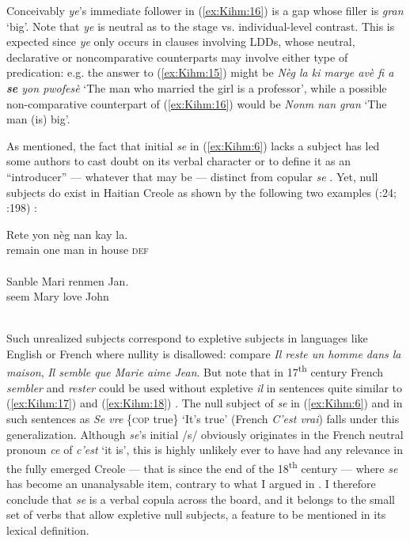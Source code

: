 \documentclass[output=paper]{langsci/langscibook}
\begin{document}
Conceivably \emph{ye}'s immediate follower in (\ref{ex:Kihm:16}) is a gap whose filler
is \emph{gran} `big'. Note that \emph{ye} is neutral as to the stage vs.
individual-level contrast. This is expected since \emph{ye} only occurs
in clauses involving LDDs, whose neutral, declarative or noncomparative
counterparts may involve either type of predication: e.g. the answer to
(\ref{ex:Kihm:15}) might be \emph{Nèg la ki marye avè fi a \textbf{se} yon pwofesè}
`The man who married the girl is a professor', while a possible
non-comparative counterpart of (\ref{ex:Kihm:16}) would be \emph{Nonm nan gran} `The
man (is) big'.

As mentioned, the fact that initial \emph{se} in (\ref{ex:Kihm:6}) lacks a subject has
led some authors to cast doubt on its verbal character %
\citep{Degraff1992} %
%
or
to define it as an ``introducer'' --- whatever that may be --- distinct
from copular \emph{se} %
\citep[see discussion in][]{Valdman78}.%
%
Yet,
null subjects do exist in Haitian Creole as shown by the following two
examples %
(\citealt{Deprez1992a}:24; \citealt{Deprez1992}:198)%
%
:


\ea\label{ex:Kihm:17} \gll Rete yon nèg nan kay la.\\
remain one man in house \textsc{def} \\
\glt {} \\

\ex\label{ex:Kihm:18} \gll Sanble Mari renmen Jan.\\
seem Mary love John \\
\glt {} \\
\z

Such unrealized subjects correspond to expletive subjects in languages
like English or French where nullity is disallowed: compare \emph{Il
reste un homme dans la maison}, \emph{Il semble que Marie aime Jean}.
But note that in 17\textsuperscript{th} century French \emph{sembler}
and \emph{rester} could be used without expletive \emph{il} in sentences
quite similar to  (\ref{ex:Kihm:17}) and (\ref{ex:Kihm:18}) %
\citep[15--16]{Haase1935a}. %
%
The null
subject of \emph{se} in (\ref{ex:Kihm:6}) and in such sentences as \emph{Se vre}
\{\textsc{cop} true\} `It's true' (French \emph{C'est vrai}) falls under
this generalization. Although \emph{se}'s initial /s/ obviously
originates in the French neutral pronoun \emph{ce} of \emph{c'est} `it
is', this is highly unlikely ever to have had any relevance in the fully
emerged Creole --- that is since the end of the 18\textsuperscript{th}
century --- where \emph{se} has become an unanalysable item, contrary to
what I argued in %
\citet{Kihm93}%
%
. I therefore conclude that \emph{se} is a
verbal copula across the board, and it belongs to the small set of verbs
that allow expletive null subjects, a feature to be mentioned in its
lexical definition.
\end{document}
